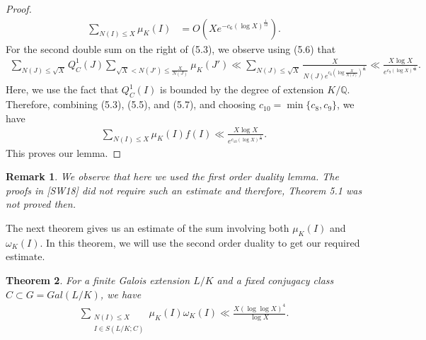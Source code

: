 \documentclass[12pt]{article}
\numberwithin{equation}{section}
\newtheorem{theorem}{Theorem}[section]
\newtheorem{remark}[theorem]{Remark}
\numberwithin{equation}{section}
\begin{document}
\begin{proof}
\begin{align}
         \sum_{N(I)\leq X} \mu_K(I)&=O\left(Xe^{-c_6(\log X)^{\frac{1}{12}}}\right)  .
     \end{align}
     For the second double sum on the right of (5.3), we observe using (5.6) that
\begin{align}
    \sum_{N(J)\leq \sqrt{X}}Q_C^1(J)\sum_{\sqrt{X}<N(J')\leq \frac{X}{N(J)}}\mu_K(J') \ll \sum_{N(J)\leq \sqrt{X}} \frac{X}{N(J)e^{c_6\left(\log \frac{X}{N(J)}\right)^{\frac{1}{12}}}} \ll \frac{X\log X}{e^{c_9(\log X)^{\frac{1}{12}}}}.
\end{align}
Here, we use the fact that $Q_C^1(I)$ is bounded by the degree of extension $K/\mathbb{Q}$.  Therefore, combining (5.3), (5.5), and (5.7), and choosing $c_{10} = \min\{c_8,c_9\}$, we have
    \begin{align}
          \sum_{N(I)\leq X}\mu_K(I)f(I) \ll \frac{X\log X}{e^{c_{10}(\log X)^{\frac{1}{12}}}}.
    \end{align}
    This proves our lemma. 
 \end{proof}
 \begin{remark}
     We observe that here we used the first order duality lemma. The proofs in [SW18] did not require such an estimate and therefore, \textit{Theorem 5.1} was not proved then. 
 \end{remark}
\noindent The next theorem gives us an estimate of the sum involving both $\mu_K(I)$ and $\omega_K(I)$. In this theorem, we will use the second order duality to get our required estimate.
\begin{theorem}
    For a finite Galois extension $L/K$ and a fixed conjugacy class $C\subset G=Gal(L/K)$, we have 
    \begin{align}
        \sum_{\substack{N(I)\leq X \\ I \in S(L/K;C)}}\mu_K(I)\omega_K(I) \ll \frac{X(\log\log X)^4}{\log X}. \nonumber
    \end{align}
\end{theorem}
\end{document}

